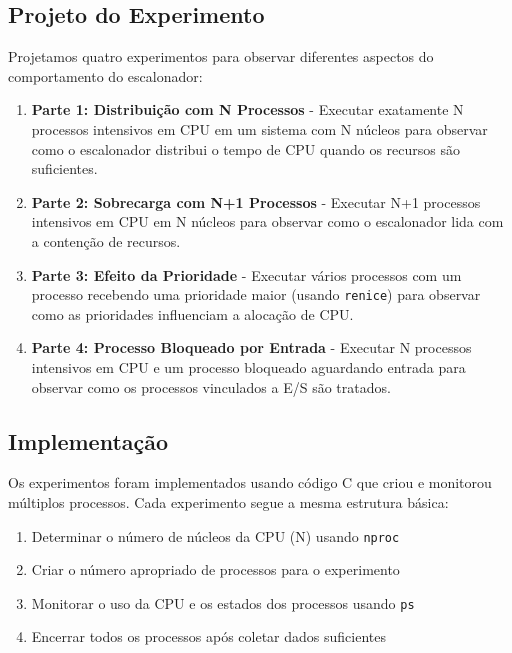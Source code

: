 \documentclass[12pt,a4paper]{article}
\begin{document}
\subsection{Projeto do Experimento}

Projetamos quatro experimentos para observar diferentes aspectos do comportamento do escalonador:

\begin{enumerate}
    \item \textbf{Parte 1: Distribuição com N Processos} - Executar exatamente N processos intensivos em CPU em um sistema com N núcleos para observar como o escalonador distribui o tempo de CPU quando os recursos são suficientes.

    \item \textbf{Parte 2: Sobrecarga com N+1 Processos} - Executar N+1 processos intensivos em CPU em N núcleos para observar como o escalonador lida com a contenção de recursos.

    \item \textbf{Parte 3: Efeito da Prioridade} - Executar vários processos com um processo recebendo uma prioridade maior (usando \texttt{renice}) para observar como as prioridades influenciam a alocação de CPU.

    \item \textbf{Parte 4: Processo Bloqueado por Entrada} - Executar N processos intensivos em CPU e um processo bloqueado aguardando entrada para observar como os processos vinculados a E/S são tratados.
\end{enumerate}

\subsection{Implementação}

Os experimentos foram implementados usando código C que criou e monitorou múltiplos processos. Cada experimento segue a mesma estrutura básica:

\begin{enumerate}
    \item Determinar o número de núcleos da CPU (N) usando \texttt{nproc}
    \item Criar o número apropriado de processos para o experimento
    \item Monitorar o uso da CPU e os estados dos processos usando \texttt{ps}
    \item Encerrar todos os processos após coletar dados suficientes
\end{enumerate}
\end{document}
